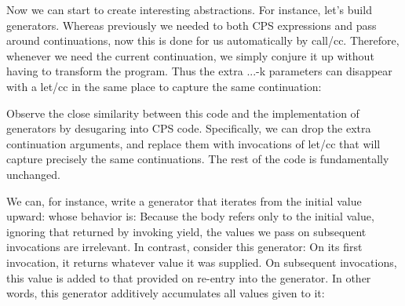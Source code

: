 
Now we can start to create interesting abstractions. For instance, let’s build
generators. Whereas previously we needed to both CPS expressions and pass around
continuations, now this is done for us automatically by call/cc. Therefore,
whenever we need the current continuation, we simply conjure it up without
having to transform the program. Thus the extra ...-k parameters can disappear
with a let/cc in the same place to capture the same continuation:

Observe the close similarity between this code and the implementation of
generators by desugaring into CPS code. Specifically, we can drop the extra
continuation arguments, and replace them with invocations of let/cc that will
capture precisely the same continuations. The rest of the code is fundamentally
unchanged.


We can, for instance, write a generator that iterates from the initial value
upward:
whose behavior is:
Because the body refers only to the initial value, ignoring that returned by
invoking yield, the values we pass on subsequent invocations are irrelevant. In
contrast, consider this generator:
On its first invocation, it returns whatever value it was supplied. On
subsequent invocations, this value is added to that provided on re-entry into
the generator. In other words, this generator additively accumulates all values
given to it:

